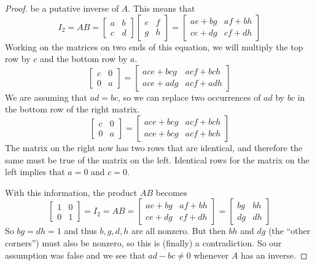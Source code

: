 \begin{proof}
%
be a putative inverse of $A$.  This means that 
%
\begin{equation*}
I_2=AB=
\begin{bmatrix}
a&b\\
c&d
\end{bmatrix}
%
\begin{bmatrix}
e&f\\
g&h
\end{bmatrix}
=
\begin{bmatrix}
ae+bg & af+bh\\
ce+dg & cf+dh
\end{bmatrix}
\end{equation*}
%
Working on the matrices on two ends of this equation, we will multiply the top row by $c$ and the bottom row by $a$.
%
\begin{equation*}
\begin{bmatrix}
c&0\\
0&a
\end{bmatrix}
=
\begin{bmatrix}
ace+bcg & acf+bch\\
ace+adg & acf+adh
\end{bmatrix}
\end{equation*}
%
We are assuming that $ad=bc$, so we can replace two occurrences of $ad$ by $bc$ in the bottom row of the right matrix.
%
\begin{equation*}
\begin{bmatrix}
c&0\\
0&a
\end{bmatrix}
=
\begin{bmatrix}
ace+bcg & acf+bch\\
ace+bcg & acf+bch
\end{bmatrix}
\end{equation*}
%
The matrix on the right now has two rows that are identical, and therefore the same must be true of the matrix on the left.    Identical rows for the matrix on the left implies that $a=0$ and $c=0$.\par
%
With this information, the product $AB$ becomes
%
\begin{equation*}
\begin{bmatrix}
1 & 0\\
0 & 1
\end{bmatrix}
=I_2
=AB
=
\begin{bmatrix}
ae+bg & af+bh\\
ce+dg & cf+dh
\end{bmatrix}
=
\begin{bmatrix}
bg & bh\\
dg & dh
\end{bmatrix}
\end{equation*}
%
So $bg=dh=1$ and thus $b,g,d,h$ are all nonzero.  But then $bh$ and $dg$ (the ``other corners'') must also be nonzero, so this is (finally) a contradiction.   So our assumption was false and we see that $ad-bc\neq 0$ whenever $A$ has an inverse.
%
\end{proof}
